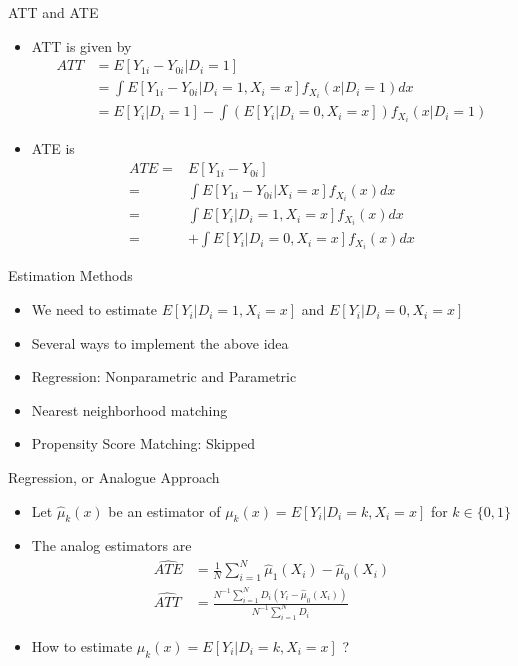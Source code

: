\documentclass[
  ignorenonframetext,
]{beamer}
\begin{document}
\begin{frame}{ATT and ATE}
\protect\hypertarget{att-and-ate}{}
\begin{itemize}
\item
  ATT is given by \[\begin{aligned}
  ATT & =E[Y_{1i}-Y_{0i}|D_{i}=1]\\
   & =\int E[Y_{1i}-Y_{0i}|D_{i}=1,X_{i}=x]f_{X_{i}}(x|D_{i}=1)dx\\
   & =E[Y_{i}|D_{i}=1]-\int\left(E[Y_{i}|D_{i}=0,X_{i}=x]\right)f_{X_{i}}(x|D_{i}=1)\end{aligned}\]
\item
  ATE is \[\begin{aligned}
  ATE= & E[Y_{1i}-Y_{0i}]\\
  = & \int E[Y_{1i}-Y_{0i}|X_{i}=x]f_{X_{i}}(x)dx\\
  = & \int E[Y_{i}|D_{i}=1,X_{i}=x]f_{X_{i}}(x)dx\\
  = & +\int E[Y_{i}|D_{i}=0,X_{i}=x]f_{X_{i}}(x)dx\end{aligned}\]
\end{itemize}
\end{frame}

\begin{frame}{Estimation Methods}
\protect\hypertarget{estimation-methods}{}
\begin{itemize}
\item
  We need to estimate \(E[Y_{i}|D_{i}=1,X_{i}=x]\) and
  \(E[Y_{i}|D_{i}=0,X_{i}=x]\)
\item
  Several ways to implement the above idea
\item
  Regression: Nonparametric and Parametric
\item
  Nearest neighborhood matching
\item
  Propensity Score Matching: Skipped
\end{itemize}

Regression, or Analogue Approach

\begin{itemize}
\item
  Let \(\hat{\mu}_{k}(x)\) be an estimator of
  \(\mu_{k}(x)=E[Y_{i}|D_{i}=k,X_{i}=x]\) for \(k\in\{0,1\}\)
\item
  The analog estimators are \[\begin{aligned}
  \hat{ATE} & =\frac{1}{N}\sum_{i=1}^{N}\hat{\mu}_{1}(X_{i})-\hat{\mu}_{0}(X_{i})\\
  \hat{ATT} & =\frac{N^{-1}\sum_{i=1}^{N}D_{i}(Y_{i}-\hat{\mu}_{0}(X_{i}))}{N^{-1}\sum_{i=1}^{N}D_{i}}\end{aligned}\]
\item
  How to estimate \(\mu_{k}(x)=E[Y_{i}|D_{i}=k,X_{i}=x]\) ?
\end{itemize}
\end{frame}
\end{document}

